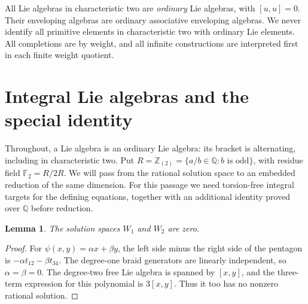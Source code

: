 \documentclass[11pt]{article}
\newtheorem{lemma}[theorem]{Lemma}
\theoremstyle{definition}
\theoremstyle{remark}
\numberwithin{equation}{section}
\begin{document}
All Lie algebras in characteristic two are \emph{ordinary} Lie
algebras, with \([u,u]=0\).  Their enveloping algebras are ordinary
associative enveloping algebras.  We never identify all primitive
elements in characteristic two with ordinary Lie elements.
All completions are by weight, and all infinite constructions are
interpreted first in each finite weight quotient.

\section{Integral Lie algebras and the special identity}
\label{sec:algebra}

Throughout, a Lie algebra is an ordinary Lie algebra: its bracket is
alternating, including in characteristic two.  Put
\(R=\mathbb Z_{(2)}=\{a/b\in\mathbb Q:b\text{ is odd}\}\), with residue field
\({\mathbb F_2}=R/2R\).  We will pass from the rational solution space to an
embedded reduction of the same dimension.  For this passage we need
torsion-free integral targets for the defining equations, together with
an additional identity proved over \(\mathbb Q\) before reduction.

\begin{lemma}\label{lem:low-weights}
The solution spaces \(W_1\) and \(W_2\) are zero.
\end{lemma}
\begin{proof}
For \(\psi(x,y)=\alpha x+\beta y\), the left side minus the right side of
the pentagon is \(-\alpha t_{12}-\beta t_{34}\).  The degree-one braid
generators are linearly independent, so \(\alpha=\beta=0\).
The degree-two free Lie algebra is spanned by \([x,y]\), and the
three-term expression for this polynomial is \(3[x,y]\).  Thus it too
has no nonzero rational solution.
\end{proof}
\end{document}

